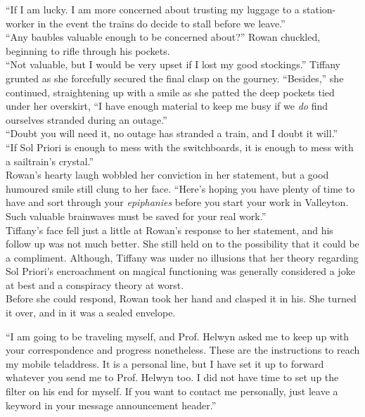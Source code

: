 ``If I am lucky. I am more concerned about trusting my luggage to a station-worker in the event the trains do decide to stall before we leave.''\\

``Any baubles valuable enough to be concerned about?'' Rowan chuckled, beginning to rifle through his pockets.\\

``Not valuable, but I would be very upset if I lost my good stockings.'' Tiffany grunted as she forcefully secured the final clasp on the gourney.
``Besides,'' she continued, straightening up with a smile as she patted the deep pockets tied under her overskirt, 
``I have enough material to keep me busy if we \textit{do} find ourselves stranded during an outage.''\\

``Doubt you will need it, no outage has stranded a train, and I doubt it will.''\\

``If Sol Priori is enough to mess with the switchboards, it is enough to mess with a sailtrain's crystal.''\\

Rowan's hearty laugh wobbled her conviction in her statement, but a good humoured smile still clung to her face.
``Here's hoping you have plenty of time to have and sort through your \textit{epiphanies} before you start your work in Valleyton. 
Such valuable brainwaves must be saved for your real work.''\\

Tiffany's face fell just a little at Rowan's response to her statement, and his follow up was not much better. 
She still held on to the possibility that it could be a compliment. 
Although, Tiffany was under no illusions that her theory regarding Sol Priori's encroachment on magical functioning was generally considered a joke at best and a conspiracy theory at worst.\\

Before she could respond, Rowan took her hand and clasped it in his.
She turned it over, and in it was a sealed envelope.

``I am going to be traveling myself, and Prof. Helwyn asked me to keep up with your correspondence and progress nonetheless. 
These are the instructions to reach my mobile teladdress. 
It is a personal line, but I have set it up to forward whatever you send me to Prof. Helwyn too. 
I did not have time to set up the filter on his end for myself. 
If you want to contact me personally, just leave a keyword in your message announcement header.''

